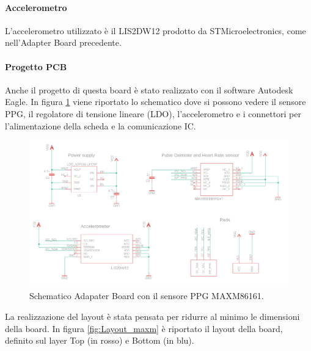\paragraph{Accelerometro} L'accelerometro utilizzato è il LIS2DW12 prodotto da STMicroelectronics, come nell'Adapter Board precedente.
\pagebreak

\paragraph{Progetto PCB} Anche il progetto di questa board è stato realizzato con il software Autodesk Eagle. In figura \ref{fig:schematic_max} viene riportato lo schematico dove si possono vedere il sensore PPG, il regolatore di tensione lineare (LDO), l'accelerometro e i connettori per l'alimentazione della scheda e la comunicazione IC.
\begin{figure}[b]
	\centering
	\includegraphics[width=0.8\linewidth]{ImageFiles/Hardware/schematic_max}
	\caption{Schematico Adapater Board con il sensore PPG MAXM86161.}
	\label{fig:schematic_max}
\end{figure}
La realizzazione del layout è stata pensata per ridurre al minimo le dimensioni della board. In figura \ref{fig:Layout_maxm} è riportato il layout della board, definito sul layer Top (in rosso) e Bottom (in blu).
